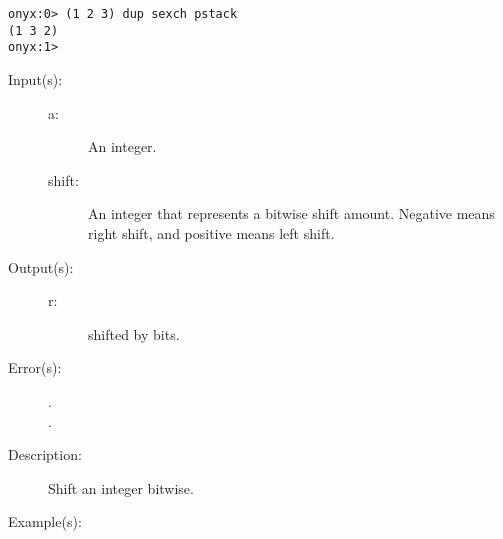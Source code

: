 \begin{description}
\begin{description}
\begin{verbatim}
onyx:0> (1 2 3) dup sexch pstack
(1 3 2)
onyx:1>
		\end{verbatim}
	\end{description}
\label{systemdict:shift}
\item[{\onyxop{--}{shift}{--}}: ]
	\begin{description}\item[]
	\item[Input(s): ]
		\begin{description}\item[]
		\item[a: ]
			An integer.
		\item[shift: ]
			An integer that represents a bitwise shift amount.
			Negative means right shift, and positive means left
			shift.
		\end{description}
	\item[Output(s): ]
		\begin{description}\item[]
		\item[r: ]
			 shifted by  bits.
		\end{description}
	\item[Error(s): ]
		\begin{description}\item[]
		\item[.]
		\item[.]
		\end{description}
	\item[Description: ]
		Shift an integer bitwise.
	\item[Example(s): ]\begin{verbatim}


\end{verbatim}
\end{description}
\end{description}
